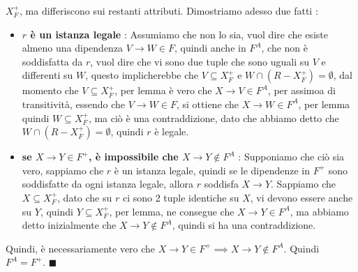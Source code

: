 \documentclass[12pt, letterpaper]{article}
\begin{document}
\(X^+_F\), ma differiscono sui restanti attributi. Dimostriamo adesso due fatti :\begin{itemize}
    \item \textbf{\(r\) è un istanza legale} : Assumiamo che non lo sia, vuol dire che esiste almeno una dipendenza \(V\rightarrow W\in F\),
    quindi anche in \(F^A\), che non è soddisfatta da \(r\), vuol dire che vi sono due tuple che sono uguali su \(V\) e 
    differenti su \(W\), questo implicherebbe che \(V\subseteq X^+_F\) e \(W\cap (R-X^+_F)=\emptyset\), dal momento che 
    \(V\subseteq X^+_F\), per lemma è vero che \(X\rightarrow V\in F^A\), per assimoa di transitività,  
    essendo che \(V\rightarrow W\in F\), si ottiene che \(X\rightarrow W\in F^A\), per lemma quindi \(W\subseteq X^+_F\), 
    ma ciò è una contraddizione, dato che abbiamo detto che  \(W\cap (R-X^+_F)=\emptyset\), quindi \(r\) è legale.
    \item \textbf{ se \(X\rightarrow Y \in F^+\), è impossibile che \(X\rightarrow Y \notin F^A\)} : Supponiamo che 
    ciò sia vero, sappiamo che \(r\) è un istanza legale, quindi se le dipendenze in \(F^+\) sono soddisfatte 
    da ogni istanza legale, allora \(r\) soddisfa \(X\rightarrow Y\). Sappiamo che \(X\subseteq X^+_F\), dato 
    che su \(r\) ci sono 2 tuple identiche su \(X\), vi devono essere anche su \(Y\), quindi \(Y\subseteq X^+_F\), 
    per lemma, ne consegue che \(X\rightarrow Y \in F^A\), ma abbiamo detto inizialmente che \(X\rightarrow Y \notin F^A\), 
    quindi si ha una contraddizione.
\end{itemize}
Quindi, è necessariamente vero che  \(X\rightarrow Y \in F^+ \implies X\rightarrow Y \notin F^A\). Quindi \(F^A=F^+\). \(\blacksquare\)
\end{document}
